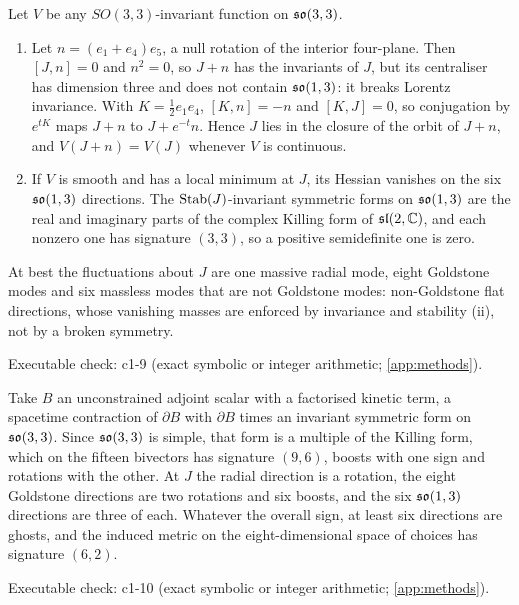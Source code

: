 \begin{theorem}
\label{thm:flat}
Let $V$ be any $SO(3,3)$-invariant function on $\mathfrak{so}(3,3)$.
\begin{enumerate}[label=(\roman*),leftmargin=2.2em]
\item Let $n=(e_1+e_4)e_5$, a null rotation of the interior four-plane. Then $[J,n]=0$ and $n^2=0$, so $J+n$ has the invariants of $J$, but its centraliser has dimension three
and does not contain $\mathfrak{so}(1,3)$: it breaks Lorentz invariance. With $K=\tfrac12e_1e_4$, $[K,n]=-n$ and $[K,J]=0$, so conjugation by $e^{tK}$ maps $J+n$ to $J+e^{-t}n$. Hence $J$
lies in the closure of the orbit of $J+n$, and $V(J+n)=V(J)$ whenever $V$ is continuous.
\item If $V$ is smooth and has a local minimum at $J$, its Hessian vanishes on the six $\mathfrak{so}(1,3)$ directions. The $\operatorname{Stab}(J)$-invariant symmetric forms on $\mathfrak{so}(1,3)$ are the real
and imaginary parts of the complex Killing form of $\mathfrak{sl}(2,\mathbb{C})$, and each nonzero one has signature $(3,3)$, so a positive semidefinite one is zero.
\end{enumerate}
At best the fluctuations about $J$ are one massive radial mode, eight Goldstone modes and six massless modes that are not Goldstone modes:
non-Goldstone flat directions, whose vanishing masses are enforced by invariance and stability (ii), not by a broken symmetry.
\end{theorem}

\noindent Executable check: c1-9 (exact symbolic or integer arithmetic; \cref{app:methods}).

\begin{proposition}
\label{prop:kineticB}
Take $B$ an unconstrained adjoint scalar with a factorised kinetic term, a spacetime contraction of $\partial B$ with $\partial B$ times an invariant
symmetric form on $\mathfrak{so}(3,3)$. Since $\mathfrak{so}(3,3)$ is simple, that form is a multiple of the Killing form, which on the fifteen bivectors has signature $(9,6)$, boosts with
one sign and rotations with the other. At $J$ the radial direction is a rotation, the eight Goldstone directions are two rotations and six boosts, and the six $\mathfrak{so}(1,3)$
directions are three of each. Whatever the overall sign, at least six directions are ghosts, and the induced metric on the eight-dimensional space of choices has
signature $(6,2)$.
\end{proposition}

\noindent Executable check: c1-10 (exact symbolic or integer arithmetic; \cref{app:methods}).

